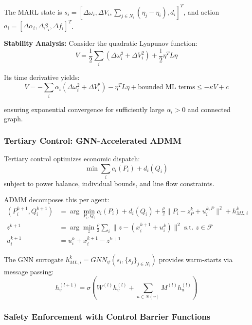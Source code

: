\documentclass[12pt]{article}
\begin{document}
The MARL state is $s_i = [\Delta\omega_i, \Delta V_i, \sum_{j \in N_i}(\eta_j - \eta_i), d_i]^T$, and action $a_i = [\Delta\alpha_i, \Delta\beta_i, \Delta f_i]^T$.

\textbf{Stability Analysis:} Consider the quadratic Lyapunov function:
\begin{equation}
V = \frac{1}{2}\sum_i (\Delta\omega_i^2 + \Delta V_i^2) + \frac{1}{2}\eta^T L \eta
\end{equation}

Its time derivative yields:
\begin{equation}
\dot{V} = -\sum_i \alpha_i (\Delta\omega_i^2 + \Delta V_i^2) - \eta^T L \dot{\eta} + \text{bounded ML terms} \leq -\kappa V + c
\end{equation}

ensuring exponential convergence for sufficiently large $\alpha_i > 0$ and connected graph.

\subsubsection{Tertiary Control: GNN-Accelerated ADMM}

Tertiary control optimizes economic dispatch:
\begin{equation}
\min \sum_i c_i(P_i) + d_i(Q_i)
\end{equation}
subject to power balance, individual bounds, and line flow constraints.

ADMM decomposes this per agent:
\begin{align}
(P_i^{k+1}, Q_i^{k+1}) &= \arg\min_{P_i,Q_i} c_i(P_i) + d_i(Q_i) + \frac{\rho}{2}\|P_i - z_P^k + u_i^{k,P}\|^2 + h_{ML,i}^k \\
z^{k+1} &= \arg\min_z \frac{\rho}{2}\sum_i \|z - (x_i^{k+1} + u_i^k)\|^2 \text{ s.t. } z \in \mathcal{F} \\
u_i^{k+1} &= u_i^k + x_i^{k+1} - z^{k+1}
\end{align}

The GNN surrogate $h_{ML,i}^k = GNN_\psi(s_i, \{s_j\}_{j \in N_i})$ provides warm-starts via message passing:
\begin{equation}
h_v^{(l+1)} = \sigma\left(W^{(l)} h_v^{(l)} + \sum_{u \in N(v)} M^{(l)} h_u^{(l)}\right)
\end{equation}

\subsubsection{Safety Enforcement with Control Barrier Functions}
\end{document}
